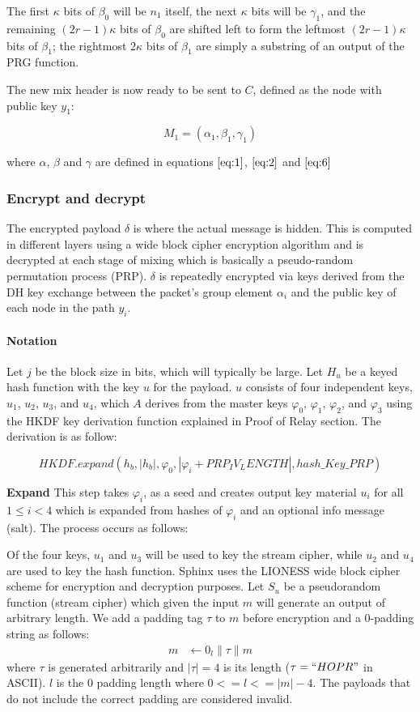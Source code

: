 The first $\kappa$ bits of $\beta_0$ will be $n_{1}$ itself, the next $\kappa$ bits will be $\gamma_{1}$, and the remaining $(2r-1)\kappa$ bits of $\beta_0$ are shifted left to form the leftmost $(2r-1)\kappa$ bits of $\beta_{1}$; the rightmost $2\kappa$ bits of $\beta_{1}$ are simply a substring of an output of the PRG function.

The new mix header is now ready to be sent to $C$, defined as the node with public key $y_1$:

$$M_1=(\alpha_1,\beta_1,\gamma_1)$$

where $\alpha$, $\beta$ and $\gamma$ are defined in equations $\ref{eq:1}$, $\ref{eq:2}$ and $\ref{eq:6}$

\subsubsection{Encrypt and decrypt}
The encrypted payload $\delta$ is where the actual message is hidden. This is computed in different layers using a wide block cipher encryption algorithm and is decrypted at each stage of mixing which is basically a pseudo-random permutation process (PRP). $\delta$ is repeatedly encrypted via keys derived from the DH key exchange between the packet’s group element $\alpha_i$ and the public key of each node in the path $y_i$.

\paragraph{Notation}
Let $j$ be the block size in bits, which will typically be large. Let $H_u$ be a keyed hash function with the key $u$ for the payload. $u$ consists of four independent keys, $u_1$, $u_2$, $u_3$, and $u_4$, which $A$ derives from the master keys $\varphi_0$, $\varphi_1$, $\varphi_2$, and $\varphi_3$ using the HKDF key derivation function explained in Proof of Relay section. The derivation is as follow:

        $$HKDF.expand(h_b, |h_b|,\varphi_0, |\varphi_i + PRP_IV_LENGTH|, hash\_Key\_PRP)$$
     
 
\textbf{Expand} This step takes $\varphi_i$, as a seed and creates output key material $u_i$ for all $1\le i < 4 $ which is expanded from hashes of $\varphi_i$ and an optional info message (salt). The process occurs as follows:

Of the four keys, $u_1$ and $u_3$ will be used to key the stream cipher, while $u_2$ and $u_4$ are used to key the hash function. Sphinx uses the LIONESS wide block cipher scheme for encryption and decryption purposes. Let $S_u$ be a pseudorandom function (stream cipher) which given the input $m$ will generate an output of arbitrary length. We add a padding tag $\tau$ to $m$ before encryption and a 0-padding string as follows:
\begin{align}
   m &\leftarrow 0_{l} \|\tau\|m
    \end{align}
where $\tau$ is generated arbitrarily and $|\tau|=4$ is its length ($\tau=``HOPR "$ in ASCII). $l$ is the $0$ padding length where $0 <= l <= |m| - 4$. The payloads that do not include the correct padding are considered invalid.

